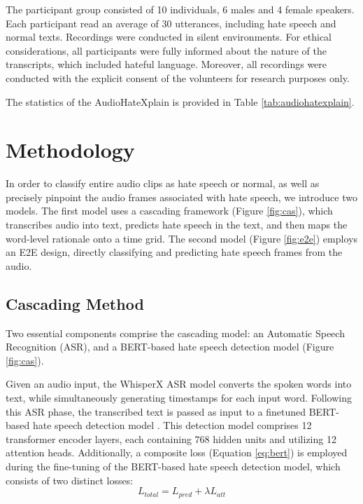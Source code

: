 \documentclass[11pt]{article}
\begin{document}
The participant group consisted of 10 individuals, 6 males and 4 female speakers. Each participant read an average of 30 utterances, including hate speech and normal texts. Recordings were conducted in silent environments. For ethical considerations, all participants were fully informed about the nature of the transcripts, which included hateful language. Moreover, all recordings were conducted with the explicit consent of the volunteers for research purposes only.

The statistics of the AudioHateXplain is provided in Table \ref{tab:audiohatexplain}.










\section{Methodology}

In order to classify entire audio clips as hate speech or normal, as well as precisely pinpoint the audio frames associated with hate speech, we introduce two models. The first model uses a cascading framework (Figure \ref{fig:cas}), which transcribes audio into text, predicts hate speech in the text, and then maps the word-level rationale onto a time grid. The second model (Figure \ref{fig:e2e}) employs an E2E design, directly classifying and predicting hate speech frames from the audio. 



\subsection{Cascading Method}
\label{sec:cas}
Two essential components comprise the cascading model: an Automatic Speech Recognition (ASR), and a BERT-based hate speech detection model (Figure \ref{fig:cas}). 


Given an audio input, the WhisperX ASR model \cite{whisper, whisperX} converts the spoken words into text, while simultaneously generating timestamps for each input word. Following this ASR phase, the transcribed text is passed as input to a finetuned BERT-based hate speech detection model \cite{HateXplain}. This detection model comprises 12 transformer encoder layers, each containing 768 hidden units and utilizing 12 attention heads. 
Additionally, a composite loss (Equation \ref{eq:bert}) is employed during the fine-tuning of the BERT-based hate speech detection model, which consists of two distinct losses:
\begin{equation}
\label{eq:bert}
    L_{total}=L_{pred}+ \lambda L_{att}
\end{equation}
\end{document}
